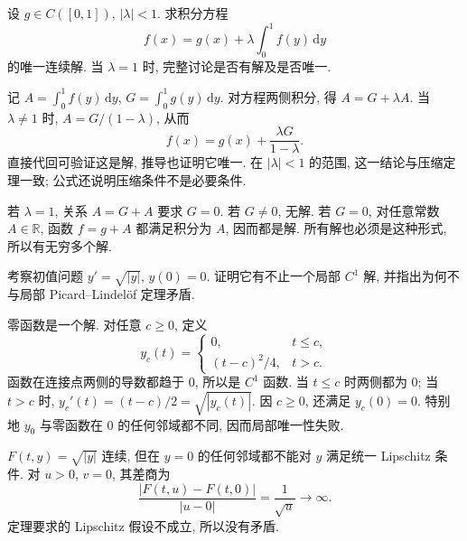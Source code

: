 \begin{exercise}\label{ex:constant-kernel}
设 $g\in C([0,1])$, $|\lambda|<1$. 求积分方程
\[
f(x)=g(x)+\lambda\int_0^1 f(y)\,\mathrm dy
\]
的唯一连续解. 当 $\lambda=1$ 时, 完整讨论是否有解及是否唯一.
\end{exercise}
\begin{solution}
记 $A=\int_0^1f(y)\,\mathrm dy$, $G=\int_0^1g(y)\,\mathrm dy$. 对方程两侧积分, 得 $A=G+\lambda A$. 当 $\lambda\ne1$ 时,
$A=G/(1-\lambda)$, 从而
\[
f(x)=g(x)+\frac{\lambda G}{1-\lambda}.
\]
直接代回可验证这是解, 推导也证明它唯一. 在 $|\lambda|<1$ 的范围, 这一结论与压缩定理一致; 公式还说明压缩条件不是必要条件.

若 $\lambda=1$, 关系 $A=G+A$ 要求 $G=0$. 若 $G\ne0$, 无解. 若 $G=0$, 对任意常数 $A\in\mathbb R$, 函数 $f=g+A$ 都满足积分为 $A$, 因而都是解. 所有解也必须是这种形式, 所以有无穷多个解.
\end{solution}

\begin{exercise}\label{ex:ode-nonunique}
考察初值问题 $y'=\sqrt{|y|}$, $y(0)=0$. 证明它有不止一个局部 $C^1$ 解, 并指出为何不与局部 Picard--Lindel\"of 定理矛盾.
\end{exercise}
\begin{solution}
零函数是一个解. 对任意 $c\geq0$, 定义
\[
y_c(t)=\begin{cases}
0,&t\leq c,\\
(t-c)^2/4,&t>c.
\end{cases}
\]
函数在连接点两侧的导数都趋于 $0$, 所以是 $C^1$ 函数. 当 $t\leq c$ 时两侧都为 $0$; 当 $t>c$ 时,
$y_c'(t)=(t-c)/2=\sqrt{|y_c(t)|}$. 因 $c\geq0$, 还满足 $y_c(0)=0$. 特别地 $y_0$ 与零函数在 $0$ 的任何邻域都不同, 因而局部唯一性失败.

$F(t,y)=\sqrt{|y|}$ 连续, 但在 $y=0$ 的任何邻域都不能对 $y$ 满足统一 Lipschitz 条件. 对 $u>0$, $v=0$, 其差商为
\[
\frac{|F(t,u)-F(t,0)|}{|u-0|}=\frac1{\sqrt u}\longrightarrow\infty.
\]
定理要求的 Lipschitz 假设不成立, 所以没有矛盾.
\end{solution}
